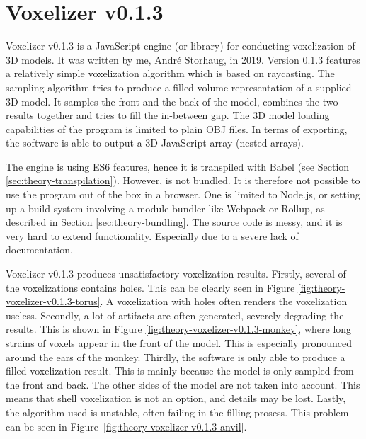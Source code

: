 \section{Voxelizer v0.1.3}
\label{sec:voxelizer-v013}
Voxelizer v0.1.3 \cite{voxelizer-v0.1.3} is a JavaScript engine (or library) for conducting voxelization of 3D models. It was written by me, André Storhaug, in 2019. Version 0.1.3 features a relatively simple voxelization algorithm which is based on raycasting. The sampling algorithm tries to produce a filled volume-representation of a supplied 3D model. It samples the front and the back of the model, combines the two results together and tries to fill the in-between gap. The 3D model loading capabilities of the program is limited to plain OBJ files. In terms of exporting, the software is able to output a 3D JavaScript array (nested arrays).

The engine is using ES6 features, hence it is transpiled with Babel (see Section \ref{sec:theory-transpilation}). However, is not bundled. It is therefore not possible to use the program out of the box in a browser. One is limited to Node.js, or setting up a build system involving a module bundler like Webpack or Rollup, as described in Section \ref{sec:theory-bundling}. The source code is messy, and it is very hard to extend functionality. Especially due to a severe lack of documentation.

Voxelizer v0.1.3 produces unsatisfactory voxelization results. Firstly, several of the voxelizations contains holes. This can be clearly seen in Figure \ref{fig:theory-voxelizer-v0.1.3-torus}. A voxelization with holes often renders the voxelization useless. Secondly, a lot of artifacts are often generated, severely degrading the results. This is shown in Figure \ref{fig:theory-voxelizer-v0.1.3-monkey}, where long strains of voxels appear in the front of the model. This is especially pronounced around the ears of the monkey. Thirdly, the software is only able to produce a filled voxelization result. This is mainly because the model is only sampled from the front and back. The other sides of the model are not taken into account. This means that shell voxelization is not an option, and details may be lost. Lastly, the algorithm used is unstable, often failing in the filling prosess. This problem can be seen in Figure~\ref{fig:theory-voxelizer-v0.1.3-anvil}.

